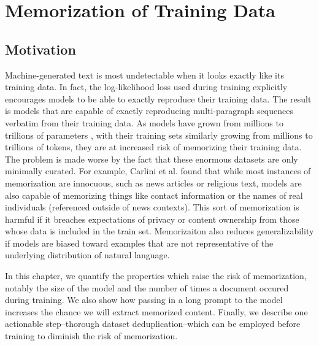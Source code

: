 \newcommand{\Approx}[0]{\textsc{NearDup}}
\newcommand{\Exact}[0]{\textsc{ExactSubstr}}
\newcommand{\Original}[0]{\textsc{Original}}
\newcommand{\pl}[1]{\hl{#1}}


\chapter{Memorization of Training Data}
\label{chap:memorization}

\section{Motivation}
Machine-generated text is most undetectable when it looks exactly like its training data.
In fact, the log-likelihood loss used during training explicitly encourages models to be able to exactly reproduce their training data.
The result is models that are capable of exactly reproducing multi-paragraph sequences verbatim from their training data.
As models have grown from millions to trillions of parameters \citep{fedus2021switch}, with their training sets similarly growing from millions to trillions of tokens, they  are at increased risk of memorizing their training data.
The problem is made worse by the fact that these enormous datasets are only minimally curated.
For example, Carlini et al. \citep{carlini2020extracting} found that while most instances of memorization are innocuous, such as news articles or religious text, models are also capable of memorizing things like contact information or the names of real individuals (referenced outside of news contexts).
This sort of memorization is harmful if it breaches expectations of privacy or content ownership from those whose data is included in the train set.
Memorizaiton also reduces generalizability if models are biased toward examples that are not representative of the underlying distribution of natural language.

In this chapter, we quantify the properties which raise the risk of memorization, notably the size of the model and the number of times a document occured during training.
We also show how passing in a long prompt to the model increases the chance we will extract memorized content.
Finally, we describe one actionable step--thorough dataset deduplication--which can be employed before training to diminish the risk of memorization.


